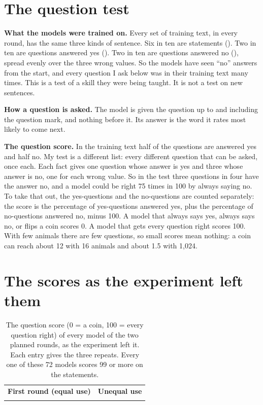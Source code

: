 \section{The question test}

\textbf{What the models were trained on.} Every set of training text, in every round, has the
same three kinds of sentence. Six in ten are statements (). Two in ten are
questions answered yes (). Two in ten are questions answered no
(), spread evenly over the three wrong values. So the models have
seen ``no'' answers from the start, and every question I ask below was in their training text
many times. This is a test of a skill they were being taught. It is not a test on new
sentences.

\textbf{How a question is asked.} The model is given the question up to and including the
question mark, and nothing before it. Its answer is the word it rates most likely to come next.

\textbf{The question score.} In the training text half of the questions are answered yes
and half no. My test is a different list: every different question that can be asked, once
each. Each fact gives one question whose answer is yes and three whose answer is no, one for
each wrong value. So in the test three questions in four have the answer no, and a model
could be right 75 times in 100 by always saying no. To take that out, the yes-questions and
the no-questions are counted separately: the score is the percentage of yes-questions answered
yes, plus the percentage of no-questions answered no, minus 100. A model that always says yes,
always says no, or flips a coin scores 0. A model that gets every question right scores 100.
With few animals there are few questions, so small scores mean nothing: a coin can reach
about 12 with 16 animals and about 1.5 with 1,024.

\section{The scores as the experiment left them}

\begin{table}[H]
\centering\small
\begin{tabular}{@{}c@{\quad}c@{}}
\textbf{First round (equal use)} & \textbf{Unequal use} \\[2pt]
 &

\end{tabular}
\caption{The question score (0 = a coin, 100 = every question right) of every model of the two
planned rounds, as the experiment left it. Each entry gives the three repeats. Every one of
these 72 models scores 99 or more on the statements.}
\label{tab:now}
\end{table}

